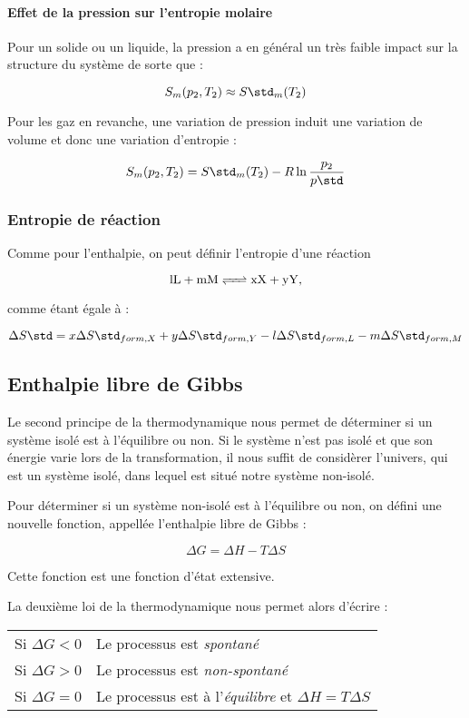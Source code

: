 \paragraph{Effet de la pression sur l'entropie molaire}
Pour un solide ou un liquide, la pression a en général un très
faible impact sur la structure du système de sorte que :

$$S_m(p_2, T_2) \approx S\std_m(T_2)$$

Pour les gaz en revanche, une variation de pression induit
une variation de volume et donc une variation d'entropie :

$$S_m(p_2, T_2) = S\std_m(T_2) - R \ln \frac{p_2}{p\std}$$

\subsubsection{Entropie de réaction}
Comme pour l'enthalpie, on peut définir l'entropie d'une réaction

$$\ce{lL + mM <=> xX + yY},$$

comme étant égale à :

$$\Delta S\std = x \Delta S\std_{form, X} + y \Delta S\std_{form, Y} -  l \Delta S\std_{form, L} -  
m \Delta S\std_{form, M}$$


\subsection{Enthalpie libre de Gibbs} 
Le second principe de la thermodynamique nous permet de déterminer
si un système isolé est à l'équilibre ou non. Si le système n'est 
pas isolé et que son énergie varie lors de la transformation, il 
nous suffit de considèrer l'univers, qui est un système isolé, dans
lequel est situé notre système non-isolé.

Pour déterminer si un système non-isolé est à l'équilibre ou non, 
on défini une nouvelle fonction, appellée l'enthalpie libre de Gibbs :

$$\Delta G = \Delta H - T\Delta S$$

Cette fonction est une fonction d'état extensive.

La deuxième loi de la thermodynamique nous permet alors d'écrire :
\begin{center}
  \begin{tabular}{ll}
    Si $\Delta G < 0$ & Le processus est \emph{spontané} \\
    Si $\Delta G > 0$ & Le processus est \emph{non-spontané} \\
    Si $\Delta G = 0$ & Le processus est à l'\emph{équilibre} et $\Delta H=T\Delta S$
  \end{tabular}
\end{center}

